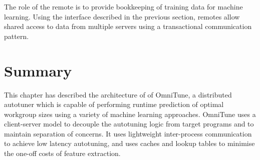 The role of the remote is to provide bookkeeping of training data for
machine learning. Using the interface described in the previous
section, remotes allow shared access to data from multiple servers
using a transactional communication pattern.


\section{Summary}

This chapter has described the architecture of of OmniTune, a
distributed autotuner which is capable of performing runtime
prediction of optimal workgroup sizes using a variety of machine
learning approaches. OmniTune uses a client-server model to decouple
the autotuning logic from target programs and to maintain separation
of concerns. It uses lightweight inter-process communication to
achieve low latency autotuning, and uses caches and lookup tables to
minimise the one-off costs of feature extraction.
